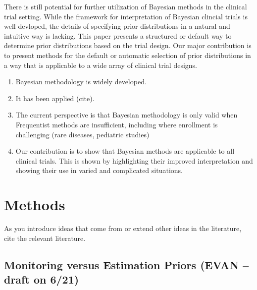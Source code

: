 \documentclass[12pt]{article}
\begin{document}
There is still potential for further utilization of Bayesian methods in the clinical trial setting. While the framework for interpretation of Bayesian clincial trials is well devloped, the details of specifying prior distributions in a natural and intuitive way is lacking. This paper presents a structured or default way to determine prior distributions based on the trial design. Our major contribution is to present methods for the default or automatic selection of prior distributions in a way that is applicable to a wide array of clinical trial designs.

\begin{enumerate}
\item Bayesian methodology is widely developed.
\item It has been applied (cite).
\item The current perspective is that Bayesian methodology is only valid when Frequentist methods are insufficient, including where enrollment is challenging (rare diseases, pediatric studies)
\item Our contribution is to show that Bayesian methods are applicable to all clinical trials. This is shown by highlighting their improved interpretation and showing their use in varied and complicated situations.
\end{enumerate}

\section{Methods}

As you introduce ideas that come from or extend other ideas in the literature, cite the relevant literature.

\subsection{Monitoring versus Estimation Priors (EVAN -- draft on 6/21)}

\end{document}
